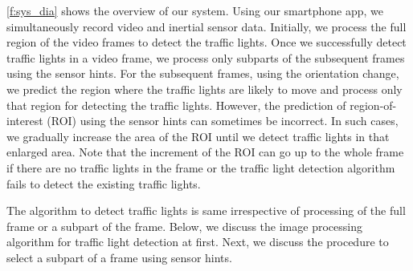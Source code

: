 \ref{f:sys_dia} shows the overview of our system.
Using our smartphone app, we simultaneously record video and inertial sensor data.
Initially, we process the full region of the video frames to detect the traffic lights.
Once we successfully detect traffic lights in a video frame, we process only subparts of the subsequent frames using the sensor hints. 
For the subsequent frames, using the orientation change, we predict the region where the traffic lights are likely to move and process only that region for detecting the traffic lights.
However, the prediction of region-of-interest (ROI) using the sensor hints can sometimes be incorrect.
In such cases, we gradually increase the area of the ROI until we detect traffic lights in that enlarged area. 
Note that the increment of the ROI can go up to the whole frame if there are no traffic lights in the frame or the traffic light detection algorithm fails to detect the existing traffic lights. 

The algorithm to detect traffic lights is same irrespective of processing of the full frame or a subpart of the frame.
Below, we discuss the image processing algorithm for traffic light detection at first. 
Next, we discuss the procedure to select a subpart of a frame using sensor hints.





